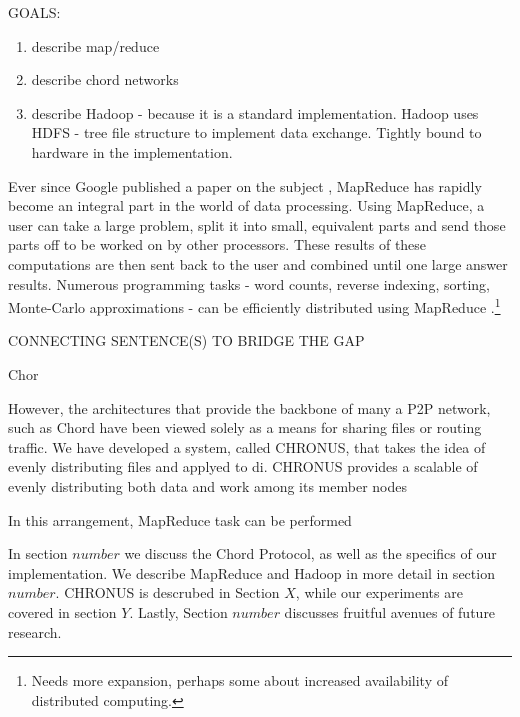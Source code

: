 \documentclass[conference, compsocconf, letterpaper]{IEEEtran}
\begin{document}
GOALS:
\begin{enumerate}
    \item describe map/reduce
    \item describe chord networks
    \item describe Hadoop - because it is a standard implementation.  Hadoop uses HDFS - tree file structure to implement data exchange.  Tightly bound to hardware in the implementation.
\end{enumerate}


Ever since Google published a paper on the subject \cite{mapreduce}, MapReduce has rapidly become an integral part in the world of data processing.  Using MapReduce, a user can take a large problem, split it into small, equivalent parts and send those parts off to be worked on by other processors.  These results of these computations are then sent back to the user and combined until one large answer results.  Numerous programming tasks - word counts, reverse indexing, sorting, Monte-Carlo approximations - can be efficiently distributed using MapReduce \cite{mapreduce}.\footnote{Needs more expansion, perhaps some about increased availability of distributed computing.}

CONNECTING SENTENCE(S) TO BRIDGE THE GAP

Chor

However, the architectures that provide the backbone of many a P2P network, such as Chord \cite{Chord} have been viewed solely as a means for sharing files  or routing traffic.  We have developed a system, called CHRONUS, that takes the idea of evenly distributing files and applyed to di.  CHRONUS provides a scalable of evenly distributing both data and work among its member nodes

In this arrangement, MapReduce task can be performed 


In section $number$ we discuss the Chord Protocol, as well as the specifics of our implementation.  We describe MapReduce and Hadoop in more detail in section $number$.  CHRONUS is descrubed in Section  $X$, while our experiments are covered in section $Y$.  Lastly, Section $number$ discusses fruitful avenues of future research.

\end{document}
